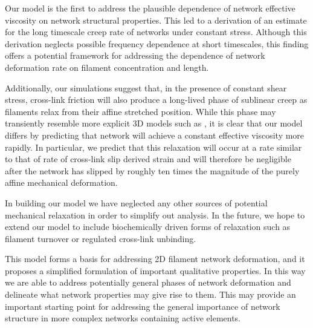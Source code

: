 Our model is the first to address the plausible dependence of network effective viscosity on network structural properties.  This led to a derivation of an estimate for the long timescale creep rate of networks under constant stress.  Although this derivation neglects possible frequency dependence at short timescales, this finding offers a potential framework for addressing the dependence of network deformation rate on filament concentration and length.

Additionally, our simulations suggest that, in the presence of constant shear stress, cross-link friction will also produce a long-lived phase of sublinear creep as filaments relax from their affine stretched position. While this phase may transiently resemble more explicit 3D models such as \cite{theo_crosslinkslip1}, it is clear that our model differs by predicting that network will achieve a constant effective viscosity more rapidly.  In particular, we predict that this relaxation will occur at a rate similar to that of rate of cross-link slip derived strain and will therefore be negligible after the network has slipped by roughly ten times the magnitude of the purely affine mechanical deformation.  

In building our model we have neglected any other sources of potential mechanical relaxation in order to simplify out analysis. In the future, we hope to extend our model to include biochemically driven forms of relaxation such as filament turnover or regulated cross-link unbinding.

This model forms a basis for addressing 2D filament network deformation, and it proposes a simplified formulation of important qualitative properties. In this way we are able to address potentially general phases of network deformation and delineate what network properties may give rise to them.  This may provide an important starting point for addressing the general importance of network structure in more complex networks containing active elements. 






































